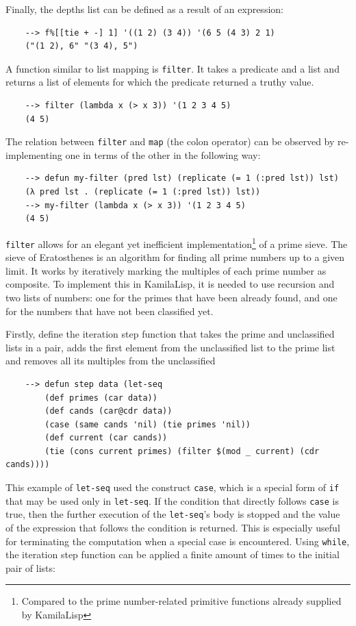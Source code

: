 Finally, the depths list can be defined as a result of an expression:

\begin{Verbatim}
    --> f%[[tie + -] 1] '((1 2) (3 4)) '(6 5 (4 3) 2 1)
    ("(1 2), 6" "(3 4), 5")
\end{Verbatim}

A function similar to list mapping is \verb|filter|. It takes a predicate and a list and returns a list of elements for which the predicate returned a truthy value.

\begin{Verbatim}
    --> filter (lambda x (> x 3)) '(1 2 3 4 5)
    (4 5)
\end{Verbatim}

The relation between \verb|filter| and \verb|map| (the colon operator) can be observed by re-implementing one in terms of the other in the following way:

\begin{Verbatim}
    --> defun my-filter (pred lst) (replicate (= 1 (:pred lst)) lst)
    (λ pred lst . (replicate (= 1 (:pred lst)) lst))
    --> my-filter (lambda x (> x 3)) '(1 2 3 4 5)
    (4 5)
\end{Verbatim}

\verb|filter| allows for an elegant yet inefficient implementation\footnote{Compared to the prime number-related primitive functions already supplied by KamilaLisp} of a prime sieve. The sieve of Eratosthenes is an algorithm for finding all prime numbers up to a given limit. It works by iteratively marking the multiples of each prime number as composite. To implement this in KamilaLisp, it is needed to use recursion and two lists of numbers: one for the primes that have been already found, and one for the numbers that have not been classified yet.

Firstly, define the iteration step function that takes the prime and unclassified lists in a pair, adds the first element from the unclassified list to the prime list and removes all its multiples from the unclassified 

\begin{Verbatim}
    --> defun step data (let-seq
        (def primes (car data))
        (def cands (car@cdr data))
        (case (same cands 'nil) (tie primes 'nil))
        (def current (car cands))
        (tie (cons current primes) (filter $(mod _ current) (cdr cands))))
\end{Verbatim}

This example of \verb|let-seq| used the construct \verb|case|, which is a special form of \verb|if| that may be used only in \verb|let-seq|. If the condition that directly follows \verb|case| is true, then the further execution of the \verb|let-seq|'s body is stopped and the value of the expression that follows the condition is returned. This is especially useful for terminating the computation when a special case is encountered. Using \verb|while|, the iteration step function can be applied a finite amount of times to the initial pair of lists:

